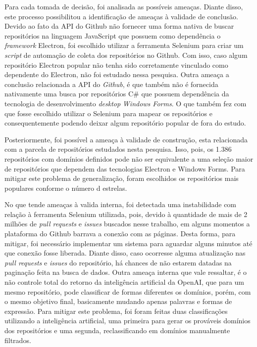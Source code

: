 \documentclass[12pt]{article}
\begin{document}
Para cada tomada de decisão, foi analisada as possíveis ameaças. Diante disso, este processo possibilitou a identificação de ameaças à validade de conclusão. Devido ao fato da API do Github não fornecer uma forma nativa de buscar repositórios na linguagem JavaScript que possuem como dependência o \textit{framework} Electron, foi escolhido utilizar a ferramenta Selenium para criar um \emph{script} de automação de coleta dos repositórios no Github. Com isso, caso algum repositório Electron popular não tenha sido corretamente vinculado como dependente do Electron, não foi estudado nessa pesquisa. Outra ameaça a conclusão relacionada a API do \emph{Github}, é que também não é fornecida nativamente uma busca por repositórios C\# que possuem dependência da tecnologia de desenvolvimento \textit{desktop} \emph{Windows Forms}. O que também fez com que fosse escolhido utilizar o Selenium para mapear os repositórios e consequentemente podendo deixar algum repositório popular de fora do estudo.

Posteriormente, foi possível a ameaça à validade de construção, esta relacionada com a parcela de repositórios estudados nesta pesquisa. Isso, pois, os 1.386 repositórios com domínios definidos pode não ser equivalente a uma seleção maior de repositórios que dependem das tecnologias Electron e Windows Forms. Para mitigar este problema de generalização, foram escolhidos os repositórios mais populares conforme o número d estrelas.

No que tende ameaças à valida interna, foi detectada uma instabilidade com relação à ferramenta Selenium utilizada, pois, devido à quantidade de mais de 2 milhões de \textit{pull requests} e \textit{issues} buscados nesse trabalho, em alguns momentos a plataforma do Github barrava a conexão com as páginas. Desta forma, para mitigar, foi necessário implementar um sistema para aguardar alguns minutos até que conexão fosse liberada. Diante disso, caso ocorresse alguma atualização nas \textit{pull requests} e \textit{issues} do repositório, há chances de não estarem datadas na paginação feita na busca de dados. Outra ameaça interna que vale ressaltar, é o não controle total do retorno da inteligência artificial da OpenAI, que para um mesmo repositório, pode classificar de formas diferentes os domínios, porém, com o mesmo objetivo final, basicamente mudando apenas palavras e formas de expressão. Para mitigar este problema, foi foram feitas duas classificações utilizando a inteligência artificial, uma primeira para gerar os prováveis domínios dos repositórios e uma segunda, reclassificando em domínios manualmente filtrados.
\end{document}
